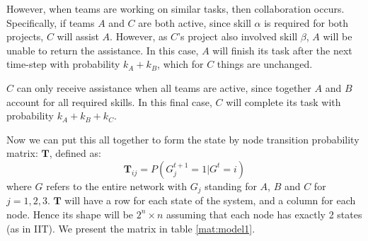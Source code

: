 \begin{steps}
	However, when teams are working on similar tasks, then collaboration occurs. Specifically, if teams $A$ and $C$ are both active, since skill $\alpha$ is required for both projects, $C$ will assist $A$. However, as $C$'s project also involved skill $\beta$, $A$ will be unable to return the assistance. In this case, $A$ will finish its task after the next time-step with probability $k_A + k_B$, which for $C$ things are unchanged. 
	
	$C$ can only receive assistance when all teams are active, since together $A$ and $B$ account for all required skills. In this final case, $C$ will complete its task with probability $k_A+k_B+k_C$.
\end{steps}


Now we can put this all together to form the state by node transition probability matrix: $\mathbf{T}$, defined as:
\begin{equation}
\mathbf{T}_{ij}= P(G_j^{t+1}=1 | G^t = i)
\end{equation}
where $G$ refers to the entire network with $G_j$ standing for $A$, $B$ and $C$ for $j=1,2,3$. $\mathbf{T}$ will have a row for each state of the system, and a column for each node. Hence its shape will be $2^n \times n$ assuming that each node has exactly 2 states (as in IIT). We present the matrix in table \ref{mat:model1}.




